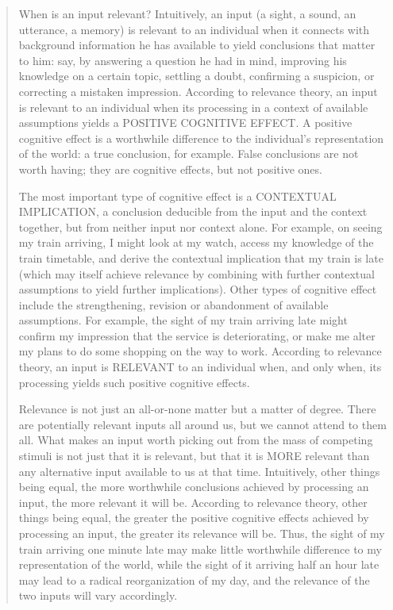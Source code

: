 \begin{quote}

When is an input relevant? Intuitively, an input (a sight, a sound, an utterance, a memory) is relevant to an individual when it connects with background information he has available to yield conclusions that matter to him: say, by answering a question he had in mind, improving his knowledge on a certain topic, settling a doubt, confirming a suspicion, or correcting a mistaken impression. According to relevance theory, an input is relevant to an individual when its processing in a context of available assumptions yields a POSITIVE COGNITIVE EFFECT. A positive cognitive effect is a worthwhile difference to the individual's representation of the world: a true conclusion, for example. False conclusions are not worth having; they are cognitive effects, but not positive ones.

The most important type of cognitive effect is a CONTEXTUAL IMPLICATION, a conclusion deducible from the input and the context together, but from neither input nor context alone. For example, on seeing my train arriving, I might look at my watch, access my knowledge of the train timetable, and derive the contextual implication that my train is late (which may itself achieve relevance by combining with further contextual assumptions to yield further implications). Other types of cognitive effect include the strengthening, revision or abandonment of available assumptions. For example, the sight of my train arriving late might confirm my impression that the service is deteriorating, or make me alter my plans to do some shopping on the way to work. According to relevance theory, an input is RELEVANT to an individual when, and only when, its processing yields such positive cognitive effects.

Relevance is not just an all-or-none matter but a matter of degree. There are potentially relevant inputs all around us, but we cannot attend to them all. What makes an input worth picking out from the mass of competing stimuli is not just that it is relevant, but that it is MORE relevant than any alternative input available to us at that time. Intuitively, other things being equal, the more worthwhile conclusions achieved by processing an input, the more relevant it will be. According to relevance theory, other things being equal, the greater the positive cognitive effects achieved by processing an input, the greater its relevance will be. Thus, the sight of my train arriving one minute late may make little worthwhile difference to my representation of the world, while the sight of it arriving half an hour late may lead to a radical reorganization of my day, and the relevance of the two inputs will vary accordingly.


\end{quote}
